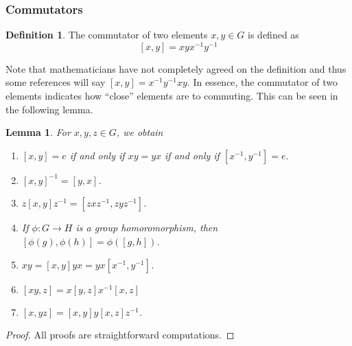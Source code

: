 \documentclass[11pt,leqno,oneside]{amsart}
\newtheorem{lem}[thm]{Lemma}
\theoremstyle{definition}
\newtheorem{defn}[thm]{Definition}
\numberwithin{equation}{section}
\begin{document}
\subsubsection*{Commutators}

\begin{defn}
    The commutator of two elements $x,y \in G$ is defined as \[
        [x,y] = xyx^{-1}y^{-1}
    \]
\end{defn}

Note that mathematicians have not completely agreed on the definition and thus
some references will say $[x,y] = x^{-1}y^{-1}xy$. In essence, the commutator
of two elements indicates how ``close'' elements are to commuting. This can be
seen in the following lemma.

\begin{lem}
    For $x,y,z \in G$, we obtain
    \begin{enumerate}[label=(\alph*)]
        \item $[x,y] = e$ if and only if $xy=yx$ if and only if $[x^{-1},y^{-1}] = e$.
        \item $[x,y]^{-1} = [y,x]$.
        \item $z[x,y]z^{-1} = [zxz^{-1},zyz^{-1}]$.
        \item If $\phi: G \to H$ is a group homoromorphism, then $[\phi(g),\phi(h)] = \phi([g,h])$.
        \item $xy = [x,y]yx = yx[x^{-1},y^{-1}]$.
        \item $[xy,z] = x[y,z]x^{-1}[x,z]$
        \item $[x,yz] = [x,y]y[x,z]z^{-1}$.
    \end{enumerate}
\end{lem}
\begin{proof}
    All proofs are straightforward computations.
\end{proof}
\end{document}
